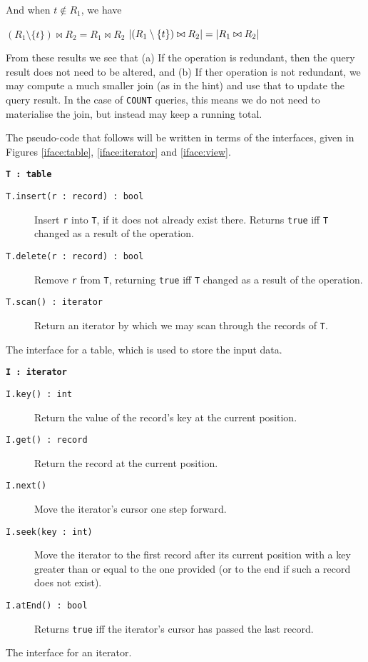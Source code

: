 And when $t\notin R_1$, we have
\begin{itemize}
  \step[\imps] $(R_1\setminus\{t\})\bowtie R_2 = R_1\bowtie R_2$
  \step[\imps] $\lvert(R_1\setminus\{t\})\bowtie R_2\rvert = \lvert R_1\bowtie R_2\rvert$
\end{itemize}

From these results we see that (a) If the operation is redundant, then the query result does not need to be altered, and (b) If ther operation is not redundant, we may compute a much smaller join (as in the hint) and use that to update the query result. In the case of \texttt{COUNT} queries, this means we do not need to materialise the join, but instead may keep a running total.

The pseudo-code that follows will be written in terms of the interfaces, given in Figures \ref{iface:table}, \ref{iface:iterator} and \ref{iface:view}.

\begin{marginfigure}
  \textbf{\texttt{T\,:\,table}}
  \begin{description}
    \item[\texttt{T.insert(r\,:\,record)\,:\,bool}]
      Insert \texttt{r} into \texttt{T}, if it does not already exist there. Returns \texttt{true} iff \texttt{T} changed as a result of the operation.
    \item[\texttt{T.delete(r\,:\,record)\,:\,bool}]
      Remove \texttt{r} from \texttt{T}, returning \texttt{true} iff \texttt{T} changed as a result of the operation.
    \item[\texttt{T.scan()\,:\,iterator}]
      Return an iterator by which we may scan through the records of \texttt{T}.
  \end{description}
  \caption{The interface for a table, which is used to store the input data.}\label{iface:table}
\end{marginfigure}

\begin{marginfigure}
  \textbf{\texttt{I\,:\,iterator}}
  \begin{description}
    \item[\texttt{I.key()\,:\,int}]
      Return the value of the record's key at the current position.
    \item[\texttt{I.get()\,:\,record}]
      Return the record at the current position.
    \item[\texttt{I.next()}]
      Move the iterator's cursor one step forward.
    \item[\texttt{I.seek(key\,:\,int)}]
      Move the iterator to the first record after its current position with a key greater than or equal to the one provided (or to the end if such a record does not exist).
    \item[\texttt{I.atEnd()\,:\,bool}]
      Returns \texttt{true} iff the iterator's cursor has passed the last record.
  \end{description}
  \caption{The interface for an iterator.}\label{iface:iterator}
\end{marginfigure}

